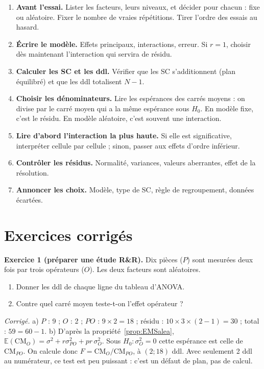 \documentclass[11pt,a4paper]{article}
\theoremstyle{sj}
\theoremstyle{definition}
\theoremstyle{remark}
\newcommand{\E}{\mathbb{E}}
\newcommand{\CM}{\mathrm{CM}}
\begin{document}
\begin{essentiel}
\begin{enumerate}[leftmargin=1.4em,itemsep=2pt]
\item \textbf{Avant l'essai.} Lister les facteurs, leurs niveaux, et décider pour chacun : fixe ou aléatoire. Fixer le nombre de vraies répétitions. Tirer l'ordre des essais au hasard.
\item \textbf{Écrire le modèle.} Effets principaux, interactions, erreur. Si $r=1$, choisir dès maintenant l'interaction qui servira de résidu.
\item \textbf{Calculer les SC et les ddl.} Vérifier que les SC s'additionnent (plan équilibré) et que les ddl totalisent $N-1$.
\item \textbf{Choisir les dénominateurs.} Lire les espérances des carrés moyens : on divise par le carré moyen qui a la même espérance sous $H_0$. En modèle fixe, c'est le résidu. En modèle aléatoire, c'est souvent une interaction.
\item \textbf{Lire d'abord l'interaction la plus haute.} Si elle est significative, interpréter cellule par cellule ; sinon, passer aux effets d'ordre inférieur.
\item \textbf{Contrôler les résidus.} Normalité, variances, valeurs aberrantes, effet de la résolution.
\item \textbf{Annoncer les choix.} Modèle, type de SC, règle de regroupement, données écartées.
\end{enumerate}
\end{essentiel}

\section{Exercices corrigés}\label{sec:exos}

\textbf{Exercice 1 (préparer une étude R\&R).} Dix pièces ($P$) sont mesurées deux fois par trois opérateurs ($O$). Les deux facteurs sont aléatoires.
\begin{enumerate}[label=\alph*),leftmargin=1.6em]
\item Donner les ddl de chaque ligne du tableau d'ANOVA.
\item Contre quel carré moyen teste-t-on l'effet opérateur ?
\end{enumerate}

\emph{Corrigé.} a) $P$ : 9 ; $O$ : 2 ; $PO$ : $9\times2=18$ ; résidu : $10\times3\times(2-1)=30$ ; total : $59=60-1$. b) D'après la propriété~\ref{prop:EMSalea}, $\E(\CM_O)=\sigma^2+r\sigma_{PO}^2+pr\,\sigma_O^2$. Sous $H_0:\sigma_O^2=0$ cette espérance est celle de $\CM_{PO}$. On calcule donc $F=\CM_O/\CM_{PO}$, à $(2;18)$ ddl. Avec seulement 2 ddl au numérateur, ce test est peu puissant : c'est un défaut de plan, pas de calcul.
\end{document}
